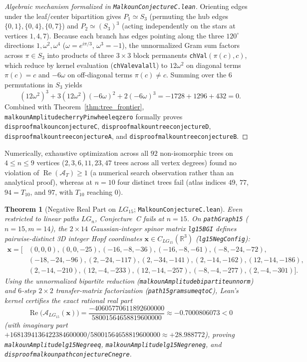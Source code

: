 \documentclass[11pt]{amsart}
\renewcommand{\_}{\origunderscore\penalty0\relax}
\theoremstyle{plain}
\newtheorem{theorem}{Theorem}[section]
\theoremstyle{definition}
\theoremstyle{remark}
\newcommand{\R}{\mathbb{R}}
\DeclareMathOperator{\RePart}{Re}
\begin{document}
\begin{proof}[Algebraic mechanism formalized in \texttt{MalkounConjectureC.lean}]
Orienting edges under the leaf/center bipartition gives $P_1 \simeq S_3$ (permuting the hub edges $\{0,1\},\{0,4\},\{0,7\}$) and $P_2 \simeq (S_3)^3$ (acting independently on the stars at vertices $1, 4, 7$). Because each branch has edges pointing along the three $120^\circ$ directions $1, \omega^2, \omega^4$ ($\omega = e^{i\pi/3}$, $\omega^3 = -1$), the unnormalized Gram sum factors across $\pi \in S_3$ into products of three $3 \times 3$ block permanents \texttt{chVal}$(\pi(c), c)$, which reduce by kernel evaluation (\texttt{chVal\_eval\_all}) to $12\omega^2$ on diagonal terms $\pi(c) = c$ and $-6\omega$ on off-diagonal terms $\pi(c) \neq c$. Summing over the $6$ permutations in $S_3$ yields
\[
    (12\omega^2)^3 + 3(12\omega^2)(-6\omega)^2 + 2(-6\omega)^3
    = -1728 + 1296 + 432 = 0.
\]
Combined with Theorem~\ref{thm:tree_frontier}, \texttt{malkounAmplitude\_cherryPinwheel\_eq\_zero} formally proves \texttt{disproof\_malkoun\_conjecture\_C}, \texttt{disproof\_malkoun\_tree\_conjecture\_D}, \texttt{disproof\_malkoun\_tree\_conjecture\_A}, and \texttt{disproof\_malkoun\_tree\_conjecture\_B}.
\end{proof}

Numerically, exhaustive optimization across all $92$ non-isomorphic trees on $4 \le n \le 9$ vertices ($2, 3, 6, 11, 23, 47$ trees across all vertex degrees) found no violation of $\RePart(\mathcal{A}_T) \ge 1$ (a numerical search observation rather than an analytical proof), whereas at $n = 10$ four distinct trees fail (atlas indices $49$, $77$, $94 = T_{10}$, and $97$, with $T_{10}$ reaching $0$).

\begin{theorem}[Negative Real Part on $LG_{15}$; \texttt{MalkounConjectureC.lean}]\label{thm:lg15}
Even restricted to linear paths $LG_n$, Conjecture~C fails at $n = 15$. On \texttt{pathGraph15} ($n=15, m=14$), the $2 \times 14$ Gaussian-integer spinor matrix \texttt{lg15BGI} defines pairwise-distinct 3D integer Hopf coordinates $\mathbf{x} \in C_{LG_{15}}(\R^3)$ (\texttt{lg15NegConfig}):
\begin{align*}
    \mathbf{x} = \bigl[&(0,0,0),(0,0,-25),(-16,-8,-36),(-16,-8,-61),(-8,-24,-72),\\
    &(-18,-24,-96),(2,-24,-117),(2,-34,-141),(2,-14,-162),(12,-14,-186),\\
    &(2,-14,-210),(12,-4,-233),(12,-14,-257),(-8,-4,-277),(2,-4,-301)\bigr].
\end{align*}
Using the unnormalized bipartite reduction (\texttt{malkounAmplitude\_bipartite\_unnorm}) and $6$-step $2 \times 2$ transfer-matrix factorization (\texttt{path15\_gram\_sum\_eq\_toC}), Lean's kernel certifies the exact rational real part
\[
    \RePart\bigl(\mathcal{A}_{LG_{15}}(\mathbf{x})\bigr) = \frac{-40605770611892600000}{58001564658819600000} \approx -0.7000806073 < 0
\]
(with imaginary part $+1681394136422384600000 / 58001564658819600000 \approx +28.988772$), proving \texttt{malkounAmplitude\_lg15Neg\_re\_eq}, \texttt{malkounAmplitude\_lg15Neg\_re\_neg}, and \texttt{disproof\_malkoun\_path\_conjecture\_C\_neg\_re}.
\end{theorem}
\end{document}
